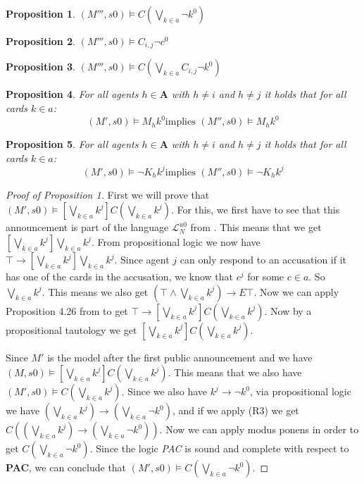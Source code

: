 \documentclass[a4paper, 10pt]{article}
\newcommand{\impl}{\rightarrow}
\newcommand{\A}{\mathbf{A}}
\newcommand{\DBox}[1]{\left[#1\right]}
\newtheorem{prop}{Proposition}
\begin{document}
\begin{prop}
    $(M''', s0) \models C(\bigvee_{k \in a} \neg k^0)$
\end{prop}
\begin{prop}
    $(M''', s0) \models C_{i, j} \neg c^0$
\end{prop}
\begin{prop}
    $(M''', s0) \models C(\bigvee_{k \in a} C_{i,j} \neg k^0)$
\end{prop}
\begin{prop}
    For all agents $h \in \A$ with $h \not = i$ and $h \not = j$ it holds
    that for all cards $k \in a$: \[ (M', s0) \models M_h k^0 \text{
            implies } (M'', s0) \models M_h k^0 \]
\end{prop}
\begin{prop}
    For all agents $h \in \A$ with $h \not = i$ and $h \not = j$ it holds
    that for all cards $k \in a$: \[ (M', s0) \models \neg K_h k^j \text{
            implies } (M'', s0) \models \neg K_h k^j \]
\end{prop}

\begin{proof}[Proof of Proposition 1]
    First we will prove that $(M', s0) \models \DBox{\bigvee_{k \in a} k^j}
    C(\bigvee_{k \in a} k^j)$. For this, we first have to see that this
    announcement is part of the language $\mathcal{L}_N^{u0}$ from
    \cite{ditmarsch2006secret}. This means that we get $\DBox{\bigvee_{k
            \in a} k^j} \bigvee_{k \in a} k^j$. From propositional logic we
    now have $\top \impl \DBox{\bigvee_{k \in a} k^j} \bigvee_{k \in a}
    k^j$. Since agent $j$ can only respond to an accusation if it has one
    of the cards in the accusation, we know that $c^j$ for some $c \in a$.
    So $\bigvee_{k \in a} k^j$. This means we also get $(\top \land
    \bigvee_{k \in a} k^j) \impl E\top$. Now we can apply Proposition 4.26
    from \citet{ditmarsch2007dynamic} to get $\top \impl \DBox{\bigvee_{k
            \in a} k^j} C\left(\bigvee_{k \in a} k^j\right)$. Now by a
    propositional tautology we get $\DBox{\bigvee_{k \in a} k^j}
    C\left(\bigvee_{k \in a} k^j\right)$.

    Since $M'$ is the model after the first public announcement and we have
    $(M, s0) \models \DBox{\bigvee_{k \in a} k^j} C\left(\bigvee_{k \in a}
        k^j\right)$. This means that we also have $(M', s0) \models
    C\left(\bigvee_{k \in a} k^j\right)$.  Since we also have $k^j \impl
    \neg k^0$, via propositional logic we have $\left(\bigvee_{k \in a} k^j
    \right) \impl \left(\bigvee_{k \in a} \neg k^0\right)$, and if we apply
    (R3) we get $C\left(\left(\bigvee_{k \in a} k^j \right) \impl
        \left(\bigvee_{k \in a} \neg k^0\right)\right)$. Now we can apply
    modus ponens in order to get $C\left(\bigvee_{k \in a} \neg
        k^0\right)$. Since the logic \textit{PAC} is sound and complete
    with respect to \textbf{PAC}, we can conclude that
    $(M', s0) \models C\left(\bigvee_{k \in a} \neg k^0\right)$.
\end{proof}
\end{document}
